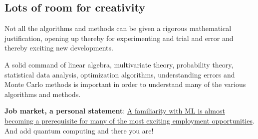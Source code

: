 \documentclass[%
oneside,                 %
final,                   %
10pt]{article}
\begin{document}
\subsection{Lots of room for creativity}
\begin{block}{}
Not all the
algorithms and methods can be given a rigorous mathematical
justification, opening up thereby for experimenting
and trial and error and thereby exciting new developments. 
\end{block}

\begin{block}{}
A solid command of linear algebra, multivariate theory, 
probability theory, statistical data analysis, optimization algorithms, 
understanding errors and Monte Carlo methods is important in order to understand many of the 
various algorithms and methods. 
\end{block}

\textbf{Job market, a personal statement}: \href{{https://www.analyticsindiamag.com/top-countries-hiring-most-number-of-artificial-intelligence-machine-learning-experts/}}{A familiarity with ML is almost becoming a prerequisite for many of the most exciting employment opportunities}. And add quantum computing and there you are!

\end{document}
